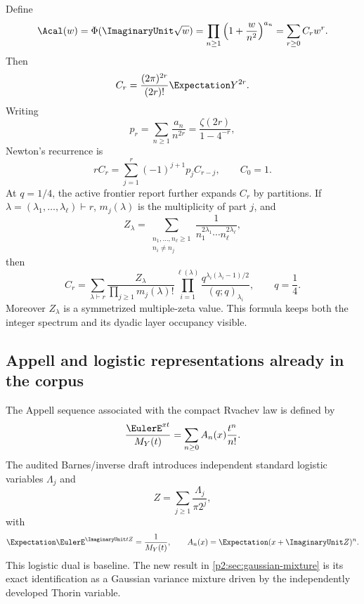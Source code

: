 \documentclass[11pt]{article}
\theoremstyle{definition}
\theoremstyle{remark}
\begin{document}
Define
\begin{equation}
 \Acal(w)=\Phi(\ImaginaryUnit\sqrt w)
 =\prod_{n\ge1}\left(1+\frac{w}{n^2}\right)^{a_n}
 =\sum_{r\ge0}C_rw^r.                                    \label{p2:eq:A-def}
\end{equation}
Then
\begin{equation}
 C_r=\frac{(2\pi)^{2r}}{(2r)!}\Expectation Y^{2r}.                 \label{p2:eq:C-moment}
\end{equation}
Writing
\begin{equation}
 p_r=\sum_{n\ge1}\frac{a_n}{n^{2r}}
 =\frac{\zeta(2r)}{1-4^{-r}},                            \label{p2:eq:pr}
\end{equation}
Newton's recurrence is
\begin{equation}
 rC_r=\sum_{j=1}^r(-1)^{j+1}p_jC_{r-j},\qquad C_0=1.    \label{p2:eq:Newton-C}
\end{equation}
At $q=1/4$, the active frontier report further expands $C_r$ by partitions.  If
$\lambda=(\lambda_1,\dots,\lambda_\ell)\vdash r$, $m_j(\lambda)$ is the multiplicity of
part $j$, and
\begin{equation}
 Z_\lambda=\sum_{\substack{n_1,\dots,n_\ell\ge1\\n_i\ne n_j}}
 \frac{1}{n_1^{2\lambda_1}\cdots n_\ell^{2\lambda_\ell}},                \label{p2:eq:Zlambda}
\end{equation}
then
\begin{equation}
 \boxed{\quad
 C_r=\sum_{\lambda\vdash r}
 \frac{Z_\lambda}{\prod_{j\ge1}m_j(\lambda)!}
 \prod_{i=1}^{\ell(\lambda)}
 \frac{q^{\lambda_i(\lambda_i-1)/2}}{(q;q)_{\lambda_i}},
 \qquad q=\frac14.
 \quad}                                                  \label{p2:eq:q-MZV}
\end{equation}
Moreover $Z_\lambda$ is a symmetrized multiple-zeta value.  This formula keeps both the
integer spectrum and its dyadic layer occupancy visible.

\subsection{Appell and logistic representations already in the corpus}

The Appell sequence associated with the compact Rvachev law is defined by
\begin{equation}
 \frac{\EulerE^{xt}}{M_Y(t)}=\sum_{n\ge0}A_n(x)\frac{t^n}{n!}. \label{p2:eq:Appell}
\end{equation}
The audited Barnes/inverse draft introduces independent standard logistic variables
$\Lambda_j$ and
\begin{equation}
 Z=\sum_{j\ge1}\frac{\Lambda_j}{\pi2^j},                 \label{p2:eq:logistic-Z}
\end{equation}
with
\begin{equation}
 \Expectation\EulerE^{\ImaginaryUnit tZ}=\frac{1}{M_Y(t)},
 \qquad
 A_n(x)=\Expectation(x+\ImaginaryUnit Z)^n.                                   \label{p2:eq:logistic-dual-baseline}
\end{equation}
This logistic dual is baseline.  The new result in \cref{p2:sec:gaussian-mixture} is its exact
identification as a Gaussian variance mixture driven by the independently developed Thorin
variable.
\end{document}
